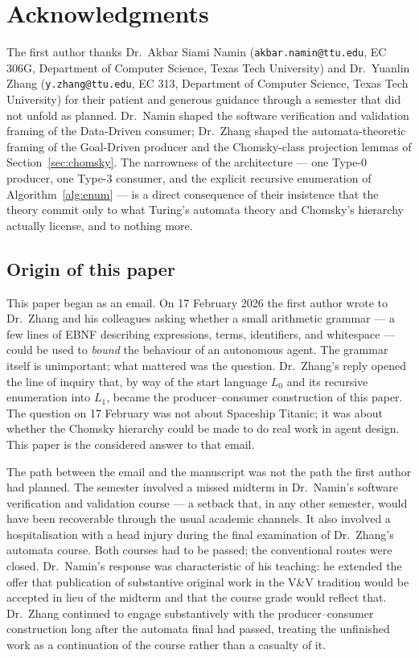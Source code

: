 \section*{Acknowledgments}
\label{sec:acknowledgments}

The first author thanks Dr.\ Akbar Siami Namin
(\texttt{akbar.namin@ttu.edu}, EC 306G, Department of Computer
Science, Texas Tech University) and Dr.\ Yuanlin Zhang
(\texttt{y.zhang@ttu.edu}, EC 313, Department of Computer
Science, Texas Tech University) for their patient and generous
guidance through a semester that did not unfold as planned.
Dr.\ Namin shaped the software verification and validation
framing of the Data-Driven consumer; Dr.\ Zhang shaped the
automata-theoretic framing of the Goal-Driven producer and the
Chomsky-class projection lemmas of Section~\ref{sec:chomsky}.
The narrowness of the architecture --- one Type-0 producer, one
Type-3 consumer, and the explicit recursive enumeration of
Algorithm~\ref{alg:enum} --- is a direct consequence of their
insistence that the theory commit only to what Turing's automata
theory and Chomsky's hierarchy actually license, and to nothing
more.

\subsection*{Origin of this paper}

This paper began as an email.  On 17 February 2026 the first
author wrote to Dr.\ Zhang and his colleagues asking whether a
small arithmetic grammar --- a few lines of EBNF describing
expressions, terms, identifiers, and whitespace --- could be
used to \emph{bound} the behaviour of an autonomous agent.
The grammar itself is unimportant; what mattered was the
question.  Dr.\ Zhang's reply opened the line of inquiry that,
by way of the start language $L_0$ and its recursive enumeration
into $L_1$, became the producer--consumer construction of this
paper.  The question on 17 February was not about Spaceship
Titanic; it was about whether the Chomsky hierarchy could be
made to do real work in agent design.  This paper is the
considered answer to that email.

The path between the email and the manuscript was not the path
the first author had planned.  The semester involved a missed
midterm in Dr.\ Namin's software verification and validation
course --- a setback that, in any other semester, would have
been recoverable through the usual academic channels.  It also
involved a hospitalisation with a head injury during the
final examination of Dr.\ Zhang's automata course.  Both
courses had to be passed; the conventional routes were closed.
Dr.\ Namin's response was characteristic of his teaching: he
extended the offer that publication of substantive original
work in the V\&V tradition would be accepted in lieu of the
midterm and that the course grade would reflect that.
Dr.\ Zhang continued to engage substantively with the
producer--consumer construction long after the automata final
had passed, treating the unfinished work as a continuation of
the course rather than a casualty of it.


